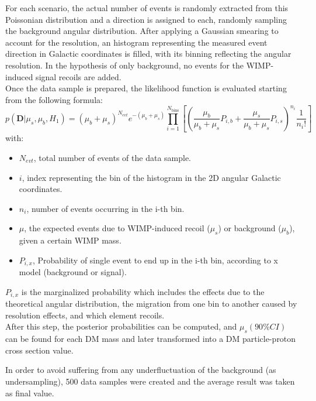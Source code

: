 \documentclass[physics,article,submit,moreauthors,pdftex]{Definitions/mdpi}
\begin{document}
For each scenario, the actual number of events is randomly extracted from this Poissonian distribution and a direction is assigned to each, randomly sampling the background angular distribution. After applying a Gaussian smearing to account for the resolution, an histogram representing the measured event direction in Galactic coordinates is filled, with its binning reflecting the angular resolution. In the hypothesis of only background, no events for the WIMP-induced signal recoils are added.\\

Once the data sample is prepared, the  likelihood function is evaluated starting from the following formula:
\begin{equation}
\label{eq:likelihood}
 p(\boldsymbol{D}|\mu_s,\mu_b,H_1)=(\mu_b+\mu_s)^{N_{evt}}e^{-(\mu_b+\mu_s)  }\prod_{i=1}^{N_{\text{bins}}} \left[ \left( \frac{\mu_b}{\mu_b+\mu_s}P_{i,b}+ \frac{\mu_s}{\mu_b+\mu_s}P_{i,s}\right)^{n_i}\frac{1}{n_i!}\right]
\end{equation}
with:
\begin{itemize}
    \item $N_{evt}$, total number of events of the data sample.
    \item $i$, index representing the bin of the histogram in the 2D angular Galactic coordinates.
    \item $n_i$, number of events occurring in the i-th bin.
    \item $\mu$, the expected events due to WIMP-induced recoil ($\mu_s$) or background ($\mu_b$), given a certain WIMP mass.
    \item $P_{i,x}$, Probability of single event to end up in the i-th bin, according to x model (background or signal).
    
\end{itemize}
$P_{i,x}$ is the marginalized probability which includes the effects due to the theoretical angular distribution, the migration from one bin to another caused by resolution effects, and which element recoils. \\
After this step, the posterior probabilities can be computed, and $\mu_s(90\%CI)$ can be found for each DM mass and later transformed into a DM particle-proton cross section value.

In order to avoid suffering from any underfluctuation of the background (as undersampling), 500 data samples were created and the average result was taken as final value. 
\end{document}

